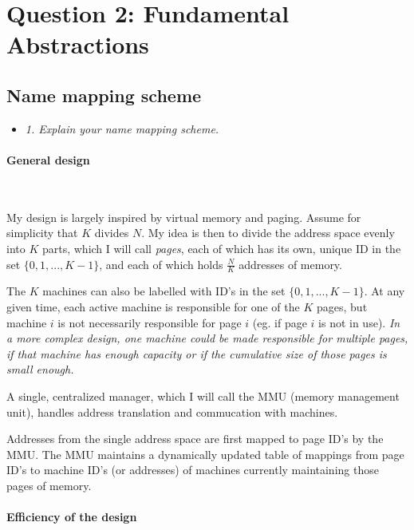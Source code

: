 \newpage
\section{Question 2: Fundamental Abstractions}


\subsection{Name mapping scheme}

\begin{itemize}
  \item \textit{1. Explain your name mapping scheme.}
\end{itemize}

\paragraph{General design}~\smallskip

My design is largely inspired by virtual memory and paging. Assume for
simplicity that
$K$ divides $N$. My idea is then to divide the address space evenly into $K$
parts, which I will call \textit{pages}, each of which has its own, unique ID in
the set $\{0, 1, ..., K-1\}$, and each of which holds $\frac{N}{K}$ addresses of
memory. \medskip

The $K$ machines can also be labelled with ID's in the set $\{0, 1, ..., K-1\}$.
At any given time, each active machine is responsible for one of the $K$ pages,
but machine $i$ is not necessarily responsible for page $i$ (eg. if page $i$ is
not in use). \textit{In a more complex design, one machine could be made
  responsible for multiple pages, if that machine has enough capacity or if the
cumulative size of those pages is small enough.}
\bigskip

A single, centralized manager, which I will call the MMU (memory management
unit), handles address translation and commucation with machines.

Addresses from the single address space are first mapped to page ID's by the
MMU. The MMU maintains a dynamically updated table of mappings from page ID's to
machine ID's (or addresses) of machines currently maintaining those pages of
memory.

\paragraph{Efficiency of the design}~\smallskip

